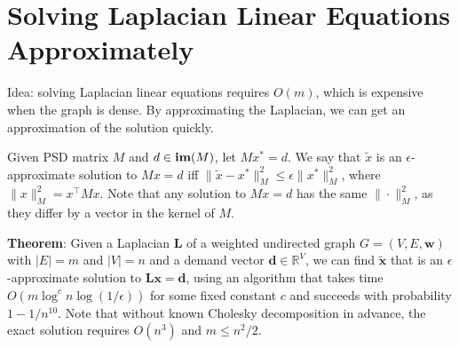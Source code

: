 \section{Solving Laplacian Linear Equations Approximately}

Idea: solving Laplacian linear equations requires $O(m)$, which is expensive when the graph is dense. By approximating the Laplacian, we can get an approximation of the solution quickly.

Given PSD matrix $M$ and $d \in \operatorname{\textbf{im}}(M)$, let $M x^* = d$. We say that $\tilde{x}$ is an $\epsilon$-approximate solution to $Mx=d$ iff $\|\tilde{x} - x^*\|_M^2 \le \epsilon \|x^*\|_M^2$, where $\|x\|_M^2 = x^\top M x$. Note that any solution to $M x = d$ has the same $\|\cdot\|_M^2$, as they differ by a vector in the kernel of $M$.

\textbf{Theorem}: Given a Laplacian $\boldsymbol{L}$ of a weighted undirected graph $G=(V, E, \boldsymbol{w})$ with $|E|=m$ and $|V|=n$ and a demand vector $\boldsymbol{d} \in \mathbb{R}^{V}$, we can find $\tilde{\boldsymbol{x}}$ that is an $\epsilon$-approximate solution to $\boldsymbol{L x}=\boldsymbol{d}$, using an algorithm that takes time $O\left(m \log ^{c} n \log (1 / \epsilon)\right)$ for some fixed constant $c$ and succeeds with probability $1-1 / n^{10}$. Note that without known Cholesky decomposition in advance, the exact solution requires $O(n^3)$ and $m \le n^2 / 2$.